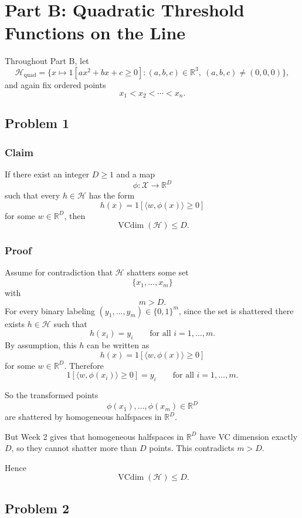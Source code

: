 \documentclass{article}
\begin{document}
\newpage
\section{Part B: Quadratic Threshold Functions on the Line}

Throughout Part B, let
$$
\mathcal{H}_{\mathrm{quad}}
=
\{x \mapsto 1[ax^2 + bx + c \ge 0] : (a,b,c) \in \mathbb{R}^3,\ (a,b,c) \ne (0,0,0)\},
$$
and again fix ordered points
$$
x_1 < x_2 < \cdots < x_n.
$$

\subsection{Problem 1}

\subsubsection{Claim}

If there exist an integer $D \ge 1$ and a map
$$
\phi : \mathcal{X} \to \mathbb{R}^D
$$
such that every $h \in \mathcal{H}$ has the form
$$
h(x) = 1[\langle w,\phi(x)\rangle \ge 0]
$$
for some $w \in \mathbb{R}^D$, then
$$
\operatorname{VCdim}(\mathcal{H}) \le D.
$$

\subsubsection{Proof}

Assume for contradiction that $\mathcal{H}$ shatters some set
$$
\{x_1,\dots,x_m\}
$$
with
$$
m > D.
$$
For every binary labeling $(y_1,\dots,y_m) \in \{0,1\}^m$, since the set is shattered there exists $h \in \mathcal{H}$ such that
$$
h(x_i) = y_i
\qquad \text{for all } i=1,\dots,m.
$$
By assumption, this $h$ can be written as
$$
h(x) = 1[\langle w,\phi(x)\rangle \ge 0]
$$
for some $w \in \mathbb{R}^D$. Therefore
$$
1[\langle w,\phi(x_i)\rangle \ge 0] = y_i
\qquad \text{for all } i=1,\dots,m.
$$

So the transformed points
$$
\phi(x_1),\dots,\phi(x_m) \in \mathbb{R}^D
$$
are shattered by homogeneous halfspaces in $\mathbb{R}^D$.

But Week 2 gives that homogeneous halfspaces in $\mathbb{R}^D$ have VC dimension exactly $D$, so they cannot shatter more than $D$ points. This contradicts $m > D$.

Hence
$$
\operatorname{VCdim}(\mathcal{H}) \le D.
$$

\subsection{Problem 2}
\end{document}
